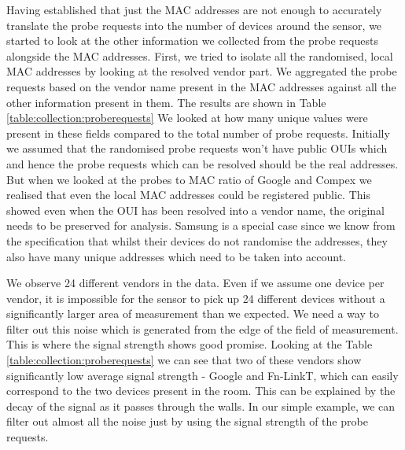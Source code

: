 Having established that just the MAC addresses are not enough to accurately translate the probe requests into the number of devices around the sensor, we started to look at the other information we collected from the probe requests alongside the MAC addresses.
First, we tried to isolate all the randomised, local MAC addresses by looking at the resolved vendor part.
We aggregated the probe requests based on the vendor name present in the MAC addresses against all the other information present in them.
The results are shown in Table \ref{table:collection:proberequests}
We looked at how many unique values were present in these fields compared to the total number of probe requests. 
Initially we assumed that the randomised probe requests won't have public OUIs which and hence the probe requests which can be resolved should be the real addresses.
But when we looked at the probes to MAC ratio of Google and Compex we realised that even the local MAC addresses could be registered public. 
This showed even when the OUI has been resolved into a vendor name, the original needs to be preserved for analysis.
Samsung is a special case since we know from the specification that whilst their devices do not randomise the addresses, they also have many unique addresses which need to be taken into account.

We observe 24 different vendors in the data. Even if we assume one device per vendor, it is impossible for the sensor to pick up 24 different devices without a significantly larger area of measurement than we expected.
We need a way to filter out this noise which is generated from the edge of the field of measurement.
This is where the signal strength shows good promise.
Looking at the Table \ref{table:collection:proberequests} we can see that two of these vendors show significantly low average signal strength - Google and Fn-LinkT, which can easily correspond to the two devices present in the room.
This can be explained by the decay of the signal as it passes through the walls.
In our simple example, we can filter out almost all the noise just by using the signal strength of the probe requests.

